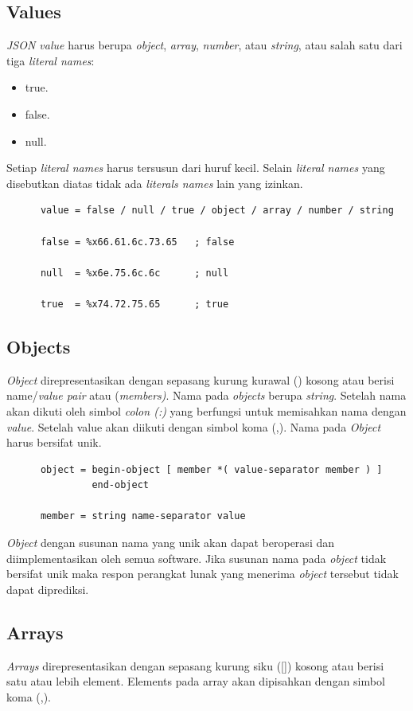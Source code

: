 \subsection{Values}
\textit{JSON value} harus berupa \textit{object}, \textit{array}, \textit{number}, atau \textit{string}, atau salah satu dari tiga \textit{literal names}:
\begin{itemize}
	\item true.
	\item false.
	\item null.
\end{itemize}
Setiap \textit{literal names} harus tersusun dari huruf kecil. Selain  \textit{literal names} yang disebutkan diatas tidak ada \textit{literals names} lain yang izinkan.

\begin{lstlisting}
      value = false / null / true / object / array / number / string

      false = %x66.61.6c.73.65   ; false

      null  = %x6e.75.6c.6c      ; null

      true  = %x74.72.75.65      ; true
\end{lstlisting}

\subsection{Objects}
\textit{Object} direpresentasikan dengan sepasang kurung kurawal ({}) kosong atau berisi name/\textit{value pair} atau (\textit{members)}. Nama pada \textit{objects} berupa \textit{string}. Setelah nama akan dikuti oleh simbol \textit{colon (:)} yang berfungsi untuk memisahkan nama dengan \textit{value}. Setelah value akan diikuti dengan simbol koma (,). Nama pada \textit{Object} harus bersifat unik.

\begin{lstlisting}
      object = begin-object [ member *( value-separator member ) ]
               end-object

      member = string name-separator value
\end{lstlisting}
\textit{Object} dengan susunan nama yang unik akan dapat beroperasi dan diimplementasikan oleh semua software. Jika susunan nama pada \textit{object} tidak bersifat unik maka respon perangkat lunak yang menerima \textit{object} tersebut tidak dapat diprediksi.

\subsection{Arrays}
\textit{Arrays} direpresentasikan dengan sepasang kurung siku ([]) kosong atau berisi satu atau lebih element. Elements pada array akan dipisahkan dengan simbol koma (,).


